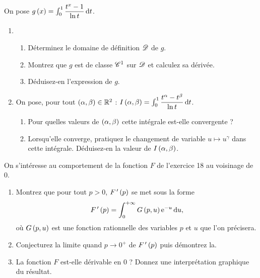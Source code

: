 \begin{exoss}~\\
On pose \(g\paren{x}=\int_0^1\dfrac{t^x-1}{\ln t}\odif{t}\).

\begin{enumerate}
    \item \begin{enumerate}
        \item Déterminez le domaine de définition \(\mathscr{D}\) de \(g\). \\
        \item Montrez que \(g\) est de classe \(\mathscr{C}^{1}\) sur \(\mathscr{D}\) et calculez sa dérivée. \\
        \item Déduisez-en l'expression de \(g\). \\
    \end{enumerate}
    \item On pose, pour tout \(\left(\alpha,\beta\right)\in\mathbb{R}^2\) : \(I\paren{\alpha,\beta}=\int_0^1\dfrac{t^\alpha-t^\beta}{\ln t}\odif{t}\). \\ \begin{enumerate}
        \item Pour quelles valeurs de \(\left(\alpha,\beta\right)\) cette intégrale est-elle convergente ? \\
        \item Lorsqu'elle converge, pratiquez le changement de variable \(u\mapsto u^\gamma\) dans cette intégrale. Déduisez-en la valeur de \(I\left(\alpha,\beta\right)\).
    \end{enumerate}
\end{enumerate}
\end{exoss}

\begin{exoss}
On s'intéresse au comportement de la fonction \(F\) de l'exercice 18 au voisinage de \(0\).

\begin{enumerate}
    \item Montrez que pour tout \(p>0\), \(F^{\,\prime}\left(p\right)\) se met sous la forme \[F\prim\paren{p}=\int_0^{\pinf}G\paren{p,u}\e{-u}\odif{u},\] où \(G\left(p,u\right)\) est une fonction rationnelle des variables \(p\) et \(u\) que l'on précisera. \\
    \item Conjecturez la limite quand \(p\to0^+\) de \(F^{\,\prime}\left(p\right)\) puis démontrez la. \\
    \item La fonction \(F\) est-elle dérivable en \(0\) ? Donnez une interprétation graphique du résultat.
\end{enumerate}
\end{exoss}

